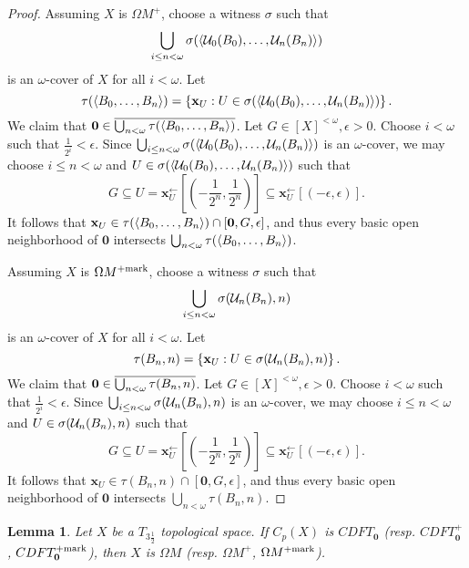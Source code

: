 \documentclass{amsart}
\renewcommand{\vec}{\mathbf}
\theoremstyle{plain}
\newtheorem{lemma}[theorem]{Lemma}
\theoremstyle{definition}
\theoremstyle{remark}
\theoremstyle{plain}
\theoremstyle{definition}
\theoremstyle{remark}
\begin{document}
\begin{proof}
  Assuming \(X\) is \(\Omega M^+\), choose a witness
  \(\sigma\) such that
  \[
    \bigcup_{i\leq n<\omega} \sigma(\langle\mathcal{U}_0(B_0),\dots,\mathcal{U}_n(B_n)\rangle)
  \]
  is an \(\omega\)-cover of \(X\) for all \(i<\omega\).
  Let
  \[
    \tau(\<B_0,\dots,B_n\>)
      =
    \left\{
      \vec x_U
    :
      U
        \in
      \sigma(\<\mc U_0(B_0),\dots,\mc U_n(B_n)\>)
    \right\}
  .\]
  We claim that \(\vec 0\in\cl{\bigcup_{n<\omega}\tau(\<B_0,\dots,B_n\>)}\).
  Let \(G\in[X]^{<\omega},\epsilon>0\). Choose \(i<\omega\) such that
  \(\frac{1}{2^i}<\epsilon\). Since
  \(\bigcup_{i\leq n<\omega} \sigma(\langle\mathcal{U}_0(B_0),\dots,\mathcal{U}_n(B_n)\rangle)\)
  is an \(\omega\)-cover, we may choose
  \(i\leq n<\omega\) and
  \(U\in\sigma(\langle\mathcal{U}_0(B_0),\dots,\mathcal{U}_n(B_n)\rangle)\)
  such that
  \[
    G
      \subseteq
    U
      =
    \vec x_U^{\leftarrow}\left[\left(-\frac{1}{2^n},\frac{1}{2^n}\right)\right]
      \subseteq
    \vec x_U^{\leftarrow}[(-\epsilon,\epsilon)]
  .\]
  It follows that
  \(\vec x_U\in \tau(\<B_0,\dots,B_n\>)\cap[\vec 0,G,\epsilon]\),
  and thus every basic open neighborhood of \(\vec 0\) intersects
  \(\bigcup_{n<\omega}\tau(\langle B_0,\dots,B_n\rangle)\).

  Assuming \(X\) is \(\Omega M^{+\mathrm{mark}}\), choose a witness
  \(\sigma\) such that
  \[
    \bigcup_{i\leq n<\omega} \sigma(\mathcal{U}_n(B_n),n)
  \]
  is an \(\omega\)-cover of \(X\) for all \(i<\omega\).
  Let
  \[
    \tau(B_n,n)
      =
    \left\{
      \vec x_U
    :
      U
        \in
      \sigma(\mc U_n(B_n),n)
    \right\}
  .\]
  We claim that \(\vec 0\in\cl{\bigcup_{n<\omega}\tau(B_n,n)}\).
  Let \(G\in[X]^{<\omega},\epsilon>0\). Choose \(i<\omega\) such that
  \(\frac{1}{2^i}<\epsilon\). Since
  \(\bigcup_{i\leq n<\omega} \sigma(\mathcal{U}_n(B_n),n)\) is an \(\omega\)-cover,
  we may choose \(i\leq n<\omega\) and
  \(U\in\sigma(\mathcal{U}_n(B_n),n)\)
  such that
  \[
    G
      \subseteq
    U
      =
    \vec x_U^{\leftarrow}\left[\left(-\frac{1}{2^n},\frac{1}{2^n}\right)\right]
      \subseteq
    \vec x_U^{\leftarrow}[(-\epsilon,\epsilon)]
  .\]
  It follows that \(\vec x_U\in \tau(B_n,n)\cap[\vec 0,G,\epsilon]\), and thus
  every basic open neighborhood of \(\vec 0\) intersects
  \(\bigcup_{n<\omega}\tau(B_n,n)\).
\end{proof}

\begin{lemma}\label{mengerFanLemma2}
  Let \(X\) be a \(T_{3\frac{1}{2}}\) topological space.
  If \(C_p(X)\) is \(CDFT_{\vec 0}\)
  (resp. \(CDFT_{\vec 0}^+\), \(CDFT_{\vec 0}^{\plusMark}\)),
  then \(X\) is \(\Omega M\)
  (resp. \(\Omega M^+\), \(\Omega M^{+\mathrm{mark}}\)).
\end{lemma}
\end{document}
